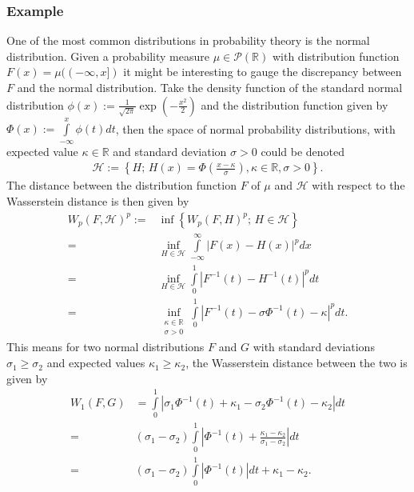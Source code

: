 \documentclass[11pt,a4paper]{article}
\begin{document}
\subsubsection{Example}
One of the most common distributions in probability theory is the normal distribution. Given a probability measure $\mu\in\mathcal{P}(\mathbb{R})$ with distribution function $F(x)=\mu((-\infty,x])$ it might be interesting to gauge the discrepancy between $F$ and the normal distribution. Take the density function of the standard normal distribution $\phi(x):=\frac{1}{\sqrt{2\pi}}\exp(-{\frac{x^2}{2}})$ and the distribution function given by $\Phi(x):=\int\limits_{-\infty}^{x}\phi(t)dt$, then the space of normal probability distributions, with expected value $\kappa\in\mathbb{R}$ and standard deviation $\sigma>0$ could be denoted
\begin{align*}
\mathcal{H}:=\left\lbrace{}H;\,H(x)=\Phi(\frac{x-\kappa}{\sigma}), \kappa\in\mathbb{R},\sigma>0\right\rbrace.
\end{align*}
The distance between the distribution function $F$ of $\mu$ and $\mathcal{H}$ with respect to the Wasserstein distance is then given by 
\begin{align*}
W_p(F,\mathcal{H})^p:=&\inf\left\lbrace{}W_p(F,H)^p;\,H\in\mathcal{H}\right\rbrace \\[5pt]=& \inf\limits_{H\in\mathcal{H}}\int\limits_{-\infty}^{\infty}|F(x)-H(x)|^pdx\\[5pt]=& \inf\limits_{H\in\mathcal{H}}\int\limits_{0}^{1}|F^{-1}(t)-H^{-1}(t)|^pdt \\[5pt]=& \inf\limits_{\substack{\kappa\in\mathbb{R}\\\sigma>0}}\int\limits_{0}^{1}|F^{-1}(t) - \sigma\Phi^{-1}(t) - \kappa|^pdt.
\end{align*}  
This means for two normal distributions $F$ and $G$ with standard deviations $\sigma_1\geq\sigma_2$ and expected values $\kappa_1\geq\kappa_2$, the Wasserstein distance between the two is given by
\begin{align*}
W_1(F,G)&=\int\limits_{0}^{1}|\sigma_1\Phi^{-1}(t)+\kappa_1-\sigma_2\Phi^{-1}(t)-\kappa_2|dt \\=&(\sigma_1-\sigma_2)\int\limits_{0}^{1}|\Phi^{-1}(t)+\frac{\kappa_1-\kappa_2}{\sigma_1-\sigma_2}|dt \\=& (\sigma_1-\sigma_2)\int\limits_{0}^{1}|\Phi^{-1}(t)|dt + \kappa_1-\kappa_2.
\end{align*}
\end{document}
